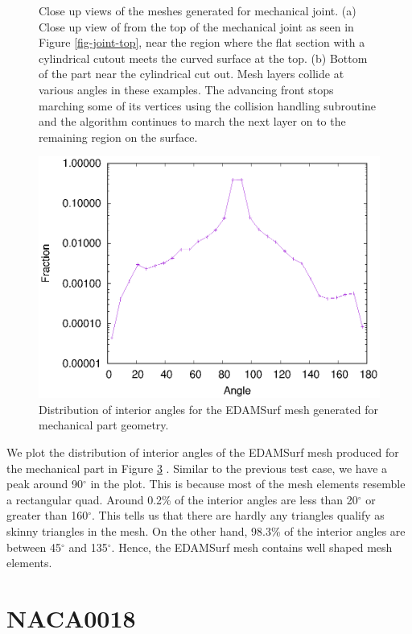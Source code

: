 \begin{figure}
\begin{subfigure}{.5\textwidth}
		\caption{}
		\label{closeUp2}
	\end{subfigure}
	\caption[Close up views of the meshes generated for mechanical joint.]{Close up views of the meshes generated for mechanical joint. (a) Close up view of from the top of the mechanical joint as seen in Figure \ref{fig-joint-top}, near the region where the flat section with a cylindrical cutout meets the curved surface at the top. (b) Bottom of the part near the cylindrical cut out. Mesh layers collide at various angles in these examples. The advancing front stops marching some of its vertices using the collision handling subroutine and the algorithm continues to march the next layer on to the remaining region on the surface.}
	\label{fig-closeUp}
\end{figure}
\begin{figure}
	\centering
	\includegraphics[width=0.5\linewidth]{img/r/joint-x0.004-g1.04-a5/jointSurfMesh.eps}
	\caption{Distribution of interior angles for the EDAMSurf mesh generated for mechanical part geometry.}
	\label{qualityJoint}
\end{figure}

We plot the distribution of interior angles of the EDAMSurf mesh produced for the mechanical part in Figure \ref{qualityJoint} . Similar to the previous test case, we have a peak around 90$^\circ$ in the plot. This is because most of the mesh elements resemble a rectangular quad. Around 0.2\% of the interior angles are less than 20$^\circ$ or greater than 160$^\circ$. This tells us that there are hardly any triangles qualify as skinny triangles in the mesh. On the other hand, 98.3\% of the interior angles are between 45$^\circ$ and 135$^\circ$. Hence, the EDAMSurf mesh contains well shaped mesh elements.

\section{NACA0018}

